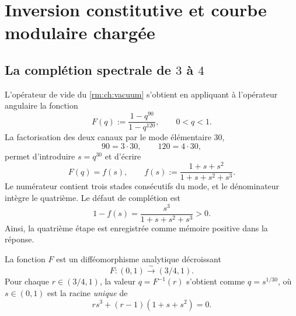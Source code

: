 \chapter{Inversion constitutive et courbe modulaire chargée}
\label{rm:chap:curva-modular-reconstruccion}

\section{La complétion spectrale de \(3\) à \(4\)}

L’opérateur de vide du \cref{rm:ch:vacuum} s’obtient en appliquant à l’opérateur angulaire la fonction
\begin{equation}
 F(q):=\frac{1-q^{90}}{1-q^{120}},
 \qquad 0<q<1.
 \label{rm:eq:curve-Fq}
\end{equation}
La factorisation des deux canaux par le mode élémentaire \(30\),
\begin{equation}
 90=3\cdot30,
 \qquad
 120=4\cdot30,
 \label{rm:eq:curve-90-120}
\end{equation}
permet d’introduire \(s=q^{30}\) et d’écrire
\begin{equation}
 F(q)=f(s),
 \qquad
 f(s):=\frac{1+s+s^2}{1+s+s^2+s^3}.
 \label{rm:eq:curve-fs}
\end{equation}
Le numérateur contient trois stades consécutifs du mode, et le dénominateur intègre le quatrième. Le défaut de complétion est
\begin{equation}
 1-f(s)=\frac{s^3}{1+s+s^2+s^3}>0.
 \label{rm:eq:curve-completion-defect}
\end{equation}
Ainsi, la quatrième étape est enregistrée comme mémoire positive dans la réponse.

\begin{theorem}
\label{rm:thm:curve-F-bijection} La fonction \(F\) est un difféomorphisme analytique décroissant
\begin{equation}
 \boxed{F:(0,1)\xrightarrow{\;\sim\;}(3/4,1).}
 \label{rm:eq:curve-F-range}
\end{equation}
Pour chaque \(r\in(3/4,1)\), la valeur \(q=F^{-1}(r)\) s’obtient comme \(q=s^{1/30}\), où \(s\in(0,1)\) est la racine \emph{unique} de
\begin{equation}
 r s^3+(r-1)(1+s+s^2)=0.
 \label{rm:eq:curve-inverse-cubic}
\end{equation}
\end{theorem}

